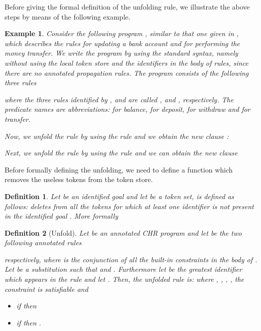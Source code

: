 \documentclass{tlp}
\newtheorem{definition}{Definition} \newtheorem{proposition}{Proposition} \newtheorem{example}{Example} \newtheorem{corollary}{Corollary} \newtheorem{theorem}{Theorem} \newtheorem{lemma}{Lemma}
\begin{document}
Before giving the formal definition of the unfolding rule, we illustrate the above steps by means of the following example.


\begin{example}\label{ex:banca}
Consider the following program , similar to that one given in \cite{SS08}, which describes the rules for updating a bank account and for performing the money transfer. We write the program by using  the standard syntax, namely without using the local token store and the identifiers in the body of rules, since there are no annotated propagation rules. The program  consists of the following three rules
\begin{small}
\end{small}
where the three rules identified by , and  are called , and , respectively. The predicate names are abbreviations:  for balance,  for deposit,  for withdraw and  for
transfer.

Now, we unfold the rule  by using the  rule  and we  obtain the new clause :
\begin{small}
\end{small}
Next, we unfold the rule  by using the  rule  and we can obtain the new clause 
\begin{small}
\end{small}
\end{example}


Before formally defining the unfolding, we need to define a
function which removes the useless tokens from the token store.

\begin{definition}\label{def:clean}
Let  be an identified goal and let  be a token set,
 is defined as
follows:  deletes from  all the tokens for
which at least one identifier is not present in the identified
goal . More formally

\end{definition}

\begin{definition}[{\sc Unfold}]\label{def:unf}
Let  be an annotated CHR program  and let  be the two
following annotated rules

respectively, where  is the conjunction of all the built-in constraints in the body
of . Let   be a substitution such that  and
. Furthermore let
 be the greatest identifier which appears in the
rule  and let .
Then, the \emph{unfolded} rule is:
 where , ,
, , the
constraint  is satisfiable and
\begin{itemize}
    \item if  then 
    \item if  then .
    \end{itemize}
\end{definition}
\end{document}
